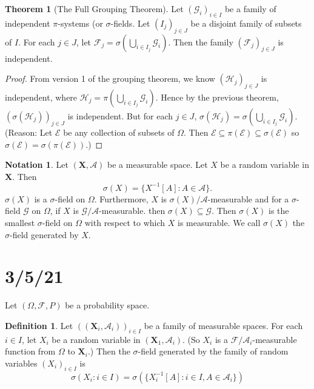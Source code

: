 \documentclass{article}
\newcommand{\F}{\mathscr{F}}
\theoremstyle{definition}
\newtheorem{theorem}{Theorem}
\newtheorem*{definition}{Definition}
\newtheorem*{notation}{Notation}
\begin{document}
\begin{theorem}[The Full Grouping Theorem]
Let $(\mathscr{G}_i)_{i \in I}$ be a family of independent $\pi$-systems (or $\sigma$-fields. Let $(I_j)_{j \in J}$ be a disjoint family of subsets of $I$. For each $j \in J$, let $\F_j = \sigma\left(\bigcup_{i \in I_j} \mathscr{G}_i\right)$. Then the family $(\F_j)_{j \in J}$ is independent.
\end{theorem}
\begin{proof}
    From version 1 of the grouping theorem, we know $(\mathscr{H}_j)_{j \in J}$ is independent, where $\mathscr{H}_j = \pi\left(\bigcup_{i \in I_j} \mathscr{G}_i\right)$.
    Hence by the previous theorem, $(\sigma(\mathscr{H}_j))_{j \in J}$ is independent.
    But for each $j \in J$, $\sigma(\mathscr{H}_j) = \sigma\left(\bigcup_{i \in I_j} \mathscr{G}_i\right)$. (Reason: Let $\mathscr{E}$ be any collection of subsets of $\Omega$. Then
    $\mathscr{E} \subseteq \pi(\mathscr{E}) \subseteq \sigma(\mathscr{E})$ so $\sigma(\mathscr{E}) = \sigma(\pi(\mathscr{E}))$.)
\end{proof}

\begin{notation}
Let $(\mathbf{X}, \mathscr{A})$ be a measurable space. Let $X$ be a random variable in $\mathbf{X}$. Then
\[
    \sigma(X) = \{X^{-1}[A] : A \in \mathscr{A}\}.
\]
$\sigma(X)$ is a $\sigma$-field on $\Omega$. Furthermore, $X$ is $\sigma(X)/\mathscr{A}$-measurable and for a $\sigma$-field $\mathscr{G}$ on $\Omega$, if $X$ is $\mathscr{G}/\mathscr{A}$-measurable. then $\sigma(X) \subseteq \mathscr{G}$. Then $\sigma(X)$ is the smallest $\sigma$-field on $\Omega$ with respect to which $X$ is measurable.
We call $\sigma(X)$ the $\sigma$-field generated by $X$.
\end{notation}

\section*{3/5/21}
Let $(\Omega, \F, P)$ be a probability space.

\begin{definition}
Let $((\mathbf{X}_i, \mathscr{A}_i))_{i \in I}$ be a family of measurable spaces. For each $i \in I$, let $X_i$ be a random variable in $(\mathbf{X}_1, \mathscr{A}_i)$. (So $X_i$ is a $\F/\mathscr{A}_i$-measurable function from $\Omega$ to $\mathbf{X}_i$.)
Then the $\sigma$-field generated by the family of random variables $(X_i)_{i \in I}$ is
\[
    \sigma(X_i : i \in I) = \sigma(\{X_i^{-1}[A] : i \in I, A \in \mathscr{A}_i\})
\]
\end{definition}
\end{document}
